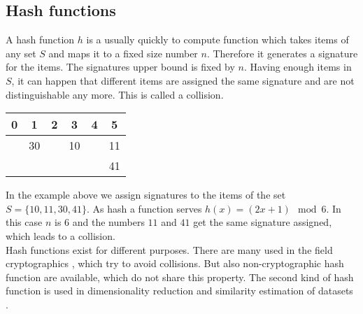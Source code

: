 \subsection{Hash functions}
A hash function $ h $ is a usually quickly to compute function which takes  items of any set $ S $ and maps it to a fixed size number $ n $. Therefore it generates a signature for the items. The signatures upper bound is fixed by $ n $. Having enough items in $ S $, it can happen that different items are assigned the same signature and are not distinguishable any more. This is called a collision.\\

\begin{table}[h!]
    \centering
    \begin{tabular}{| c | c | c | c | c | c |}
        \hline
        0  & 1  & 2  & 3  & 4  & 5  \\
        \hline
           & 30 &    & 10 &    & 11 \\
        \hline
           &    &    &    &    & 41 \\
        \hline
    \end{tabular}   
\end{table}
    
In the example above we assign signatures to the items of the set $ S = \{ 10,11,30,41 \} $. As hash a function serves $ h(x) = (2x+1) \mod 6 $.  In this case $ n $ is $ 6 $ and the numbers $ 11 $ and $ 41 $ get the same signature assigned, which leads to a collision.\\

Hash functions exist for different purposes. There are many used in the field cryptographics \cite{cryptographicHashFunctions}, which try to avoid collisions. But also non-cryptographic hash function are available, which do not share this property. The second kind of hash function is used in dimensionality reduction and similarity estimation of datasets \cite{practicalHashFunctions}.\\